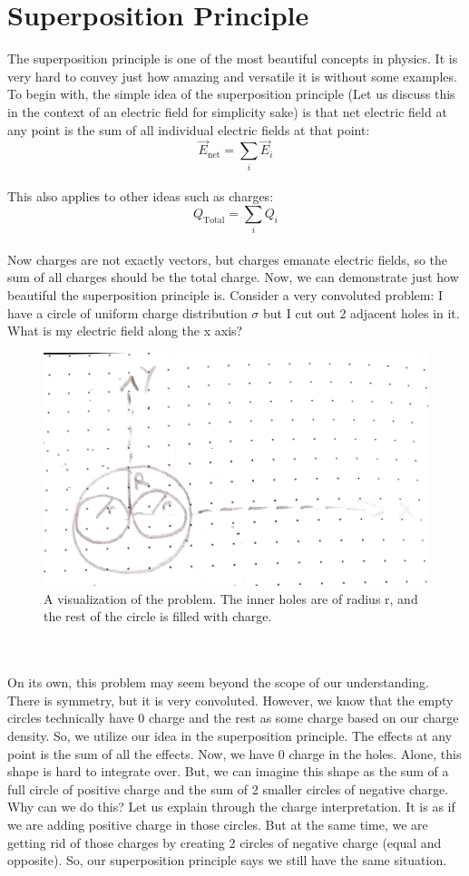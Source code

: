 \documentclass{article}
\begin{document}
\pagebreak

\section{Superposition Principle}
The superposition principle is one of the most beautiful concepts in physics. It is very hard to convey just how amazing and versatile it is without some examples. To begin with, the simple idea of the superposition principle (Let us discuss this in the context of an electric field for simplicity sake) is that net electric field at any point is the sum of all individual electric fields at that point:\\
\begin{equation*}
	\vec{E}_{\text{net}} = \sum\limits_{i} \vec{E}_i
\end{equation*}\\
This also applies to other ideas such as charges:\\
\begin{equation*}
	Q_\text{Total} = \sum\limits_{i} Q_i
\end{equation*}\\
Now charges are not exactly vectors, but charges emanate electric fields, so the sum of all charges should be the total charge. Now, we can demonstrate just how beautiful the superposition principle is. Consider a very convoluted problem: I have a circle of uniform charge distribution $\sigma$ but I cut out 2 adjacent holes in it. What is my electric field along the x axis?\\
\begin{figure}[ht]
\center
\includegraphics[width=.4\textwidth]{Superposition1.jpg}
\caption{A visualization of the problem. The inner holes are of radius r, and the rest of the circle is filled with charge.}
\end{figure}\\
\\
On its own, this problem may seem beyond the scope of our understanding. There is symmetry, but it is very convoluted. However, we know that the empty circles technically have 0 charge and the rest as some charge based on our charge density. So, we utilize our idea in the superposition principle. The effects at any point is the sum of all the effects. Now, we have 0 charge in the holes. Alone, this shape is hard to integrate over. But, we can imagine this shape as the sum of a full circle of positive charge and the sum of 2 smaller circles of negative charge. Why can we do this? Let us explain through the charge interpretation. It is as if we are adding positive charge in those circles. But at the same time, we are getting rid of those charges by creating 2 circles of negative charge (equal and opposite). So, our superposition principle says we still have the same situation.\\
\end{document}
